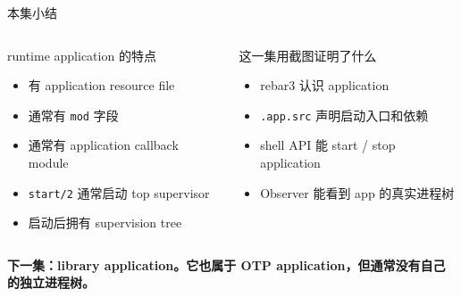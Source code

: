 \documentclass[aspectratio=169, 9pt]{beamer}
\newcommand{\warn}[1]{\textbf{\color{warning}#1}}
\newcommand{\code}[1]{\texttt{#1}}
\begin{document}
\begin{frame}{本集小结}
  \begin{columns}[T,onlytextwidth]
    \begin{block}{runtime application 的特点}
      \begin{itemize}
        \item 有 application resource file
        \item 通常有 \code{mod} 字段
        \item 通常有 application callback module
        \item \code{start/2} 通常启动 top supervisor
        \item 启动后拥有 supervision tree
      \end{itemize}
    \end{block}
    \footnotesize
    \begin{exampleblock}{这一集用截图证明了什么}
      \begin{itemize}
        \item rebar3 认识 application
        \item \code{.app.src} 声明启动入口和依赖
        \item shell API 能 start / stop application
        \item Observer 能看到 app 的真实进程树
      \end{itemize}
    \end{exampleblock}
  \end{columns}
  \vspace{0.25cm}
  \centering
  \warn{下一集：library application。它也属于 OTP application，但通常没有自己的独立进程树。}
\end{frame}
\end{document}
